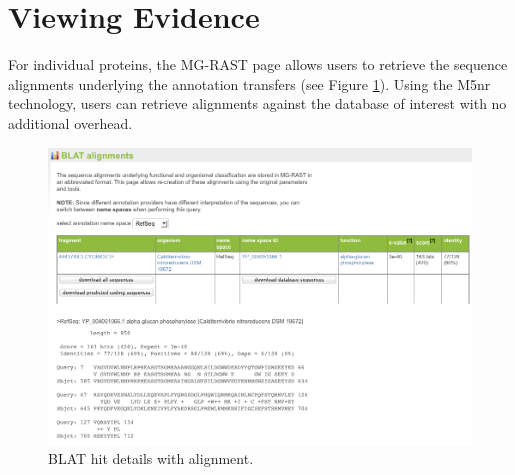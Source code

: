 \documentclass[12pt,fullpage]{report}
\begin{document}
\section{Viewing Evidence}

For individual proteins, the MG-RAST page allows users to retrieve the sequence alignments underlying the annotation transfers (see Figure \ref{fig:blat-alignment}).
Using the M5nr \cite{M5NR} technology, users can retrieve alignments against the database of interest with no additional overhead.

\begin{figure}[ht]
\begin{center}
\includegraphics[width=6in]{Images/blat-alignment.png}
\end{center}
\caption{
BLAT hit details with alignment.
}
\label{fig:blat-alignment}
\end{figure}



\end{document}
